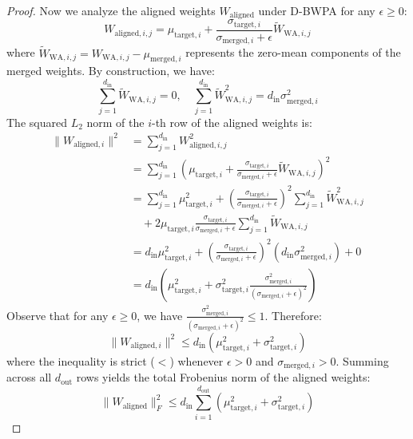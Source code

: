 \documentclass{article}
\theoremstyle{plain}
\theoremstyle{definition}
\theoremstyle{remark}
\begin{document}
\begin{proof}
Now we analyze the aligned weights $W_{\mathrm{aligned}}$ under D-BWPA for any $\epsilon \ge 0$:
\begin{equation}
  W_{\mathrm{aligned}, i, j} = \mu_{\mathrm{target}, i} + \frac{\sigma_{\mathrm{target}, i}}{\sigma_{\mathrm{merged}, i} + \epsilon} \tilde{W}_{\mathrm{WA}, i, j}
\end{equation}
where $\tilde{W}_{\mathrm{WA}, i, j} = W_{\mathrm{WA}, i, j} - \mu_{\mathrm{merged}, i}$ represents the zero-mean components of the merged weights. By construction, we have:
\begin{equation}
  \sum_{j=1}^{d_{\mathrm{in}}} \tilde{W}_{\mathrm{WA}, i, j} = 0, \quad \sum_{j=1}^{d_{\mathrm{in}}} \tilde{W}_{\mathrm{WA}, i, j}^2 = d_{\mathrm{in}} \sigma_{\mathrm{merged}, i}^2
\end{equation}
The squared $L_2$ norm of the $i$-th row of the aligned weights is:
\begin{equation}
\begin{split}
  \|W_{\mathrm{aligned}, i}\|^2 &= \sum_{j=1}^{d_{\mathrm{in}}} W_{\mathrm{aligned}, i, j}^2 \\
  &= \sum_{j=1}^{d_{\mathrm{in}}} \left( \mu_{\mathrm{target}, i} + \frac{\sigma_{\mathrm{target}, i}}{\sigma_{\mathrm{merged}, i} + \epsilon} \tilde{W}_{\mathrm{WA}, i, j} \right)^2 \\
  &= \sum_{j=1}^{d_{\mathrm{in}}} \mu_{\mathrm{target}, i}^2 + \left( \frac{\sigma_{\mathrm{target}, i}}{\sigma_{\mathrm{merged}, i} + \epsilon} \right)^2 \sum_{j=1}^{d_{\mathrm{in}}} \tilde{W}_{\mathrm{WA}, i, j}^2 \\
  &\quad + 2 \mu_{\mathrm{target}, i} \frac{\sigma_{\mathrm{target}, i}}{\sigma_{\mathrm{merged}, i} + \epsilon} \sum_{j=1}^{d_{\mathrm{in}}} \tilde{W}_{\mathrm{WA}, i, j} \\
  &= d_{\mathrm{in}} \mu_{\mathrm{target}, i}^2 + \left( \frac{\sigma_{\mathrm{target}, i}}{\sigma_{\mathrm{merged}, i} + \epsilon} \right)^2 \left( d_{\mathrm{in}} \sigma_{\mathrm{merged}, i}^2 \right) + 0 \\
  &= d_{\mathrm{in}} \left( \mu_{\mathrm{target}, i}^2 + \sigma_{\mathrm{target}, i}^2 \frac{\sigma_{\mathrm{merged}, i}^2}{(\sigma_{\mathrm{merged}, i} + \epsilon)^2} \right)
\end{split}
\end{equation}
Observe that for any $\epsilon \ge 0$, we have $\frac{\sigma_{\mathrm{merged}, i}^2}{(\sigma_{\mathrm{merged}, i} + \epsilon)^2} \le 1$. Therefore:
\begin{equation}
  \|W_{\mathrm{aligned}, i}\|^2 \le d_{\mathrm{in}} \left( \mu_{\mathrm{target}, i}^2 + \sigma_{\mathrm{target}, i}^2 \right)
\end{equation}
where the inequality is strict ($<$) whenever $\epsilon > 0$ and $\sigma_{\mathrm{merged}, i} > 0$.
Summing across all $d_{\mathrm{out}}$ rows yields the total Frobenius norm of the aligned weights:
\begin{equation}
  \|W_{\mathrm{aligned}}\|_F^2 \le d_{\mathrm{in}} \sum_{i=1}^{d_{\mathrm{out}}} \left( \mu_{\mathrm{target}, i}^2 + \sigma_{\mathrm{target}, i}^2 \right)
\end{equation}


\end{proof}
\end{document}
